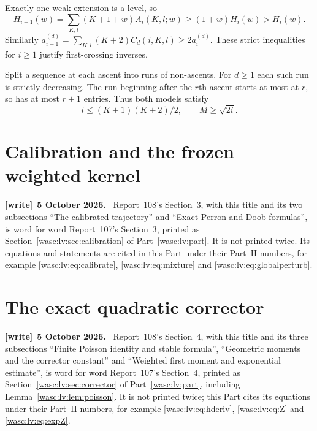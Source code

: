 \documentclass[11pt,a4paper]{article}
\theoremstyle{remark}\newtheorem{remark}[theorem]{Remark}
\numberwithin{equation}{section}
\newenvironment{writenote}[1][]{\par\smallskip\begingroup\small
 \noindent\textbf{[write]}\if\relax\detokenize{#1}\relax\else~\textbf{#1.}\fi\ }%
 {\par\endgroup\smallskip}
\begin{document}
Exactly one weak extension is a level, so
\begin{equation}\label{wasc:sh:eq:monotone}
H_{i+1}(w)=\sum_{K,l}(K+1+w)A_i(K,l;w)\ge(1+w)H_i(w)>H_i(w).
\end{equation}
Similarly $a_{i+1}^{(d)}=\sum_{K,l}(K+2)C_d(i,K,l)\ge2a_i^{(d)}$. These strict inequalities for $i\ge1$ justify first-crossing inverses.

Split a sequence at each ascent into runs of non-ascents. For $d\ge1$ each such run is strictly decreasing. The run beginning after the $r$th ascent starts at most at $r$, so has at most $r+1$ entries. Thus both models satisfy
\begin{equation}\label{wasc:sh:eq:reachable}
i\le (K+1)(K+2)/2,\qquad M\ge\sqrt{2i}.
\end{equation}

\section{Calibration and the frozen weighted kernel}\label{wasc:sh:sec:calibration}
\begin{writenote}[5 October 2026]
Report~108's Section~3, with this title and its two subsections ``The calibrated trajectory'' and ``Exact Perron and Doob formulas'', is word for word Report~107's Section~3, printed as Section~\ref{wasc:lv:sec:calibration} of Part~\ref{wasc:lv:part}. It is not printed twice. Its equations and statements are cited in this Part under their Part~II numbers, for example \eqref{wasc:lv:eq:calibrate}, \eqref{wasc:lv:eq:mixture} and \eqref{wasc:lv:eq:globalperturb}.
\end{writenote}
\section{The exact quadratic corrector}\label{wasc:sh:sec:corrector}
\begin{writenote}[5 October 2026]
Report~108's Section~4, with this title and its three subsections ``Finite Poisson identity and stable formula'', ``Geometric moments and the corrector constant'' and ``Weighted first moment and exponential estimate'', is word for word Report~107's Section~4, printed as Section~\ref{wasc:lv:sec:corrector} of Part~\ref{wasc:lv:part}, including Lemma~\ref{wasc:lv:lem:poisson}. It is not printed twice; this Part cites its equations under their Part~II numbers, for example \eqref{wasc:lv:eq:hderiv}, \eqref{wasc:lv:eq:Z} and \eqref{wasc:lv:eq:expZ}.
\end{writenote}
\end{document}
